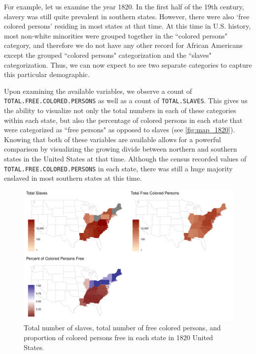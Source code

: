 \documentclass[DIV=calc, paper=a4, fontsize=10pt, twocolumn]{scrartcl}\usepackage[]{graphicx}\usepackage[]{color}
\newenvironment{knitrout}{}{} %
\begin{document}
\par For example, let us examine the year 1820. In the first half of the 19th century, slavery was still quite prevalent in southern states. However, there were also `free colored persons' residing in most states at that time. At this time in U.S. history, most non-white minorities were grouped together in the ``colored persons" category, and therefore we do not have any other record for African Americans except the grouped ``colored persons" categorization and the ``slaves" categorization. Thus, we can now expect to see two separate categories to capture this particular demographic.  

\par Upon examining the available variables, we observe a count of \texttt{TOTAL.FREE.COLORED.PERSONS} as well as a count of \texttt{TOTAL.SLAVES}. This gives us the ability to visualize not only the total numbers in each of these categories within each state, but also the percentage of colored persons in each state that were categorized as ``free persons" as opposed to slaves (see \autoref{fig:map_1820}). Knowing that both of these variables are available allows for a powerful comparison by visualizing the growing divide between northern and southern states in the United States at that time. Although the census recorded values of \texttt{TOTAL.FREE.COLORED.PERSONS} in each state, there was still a huge majority enslaved in most southern states at this time.  


\begin{knitrout}
\color{fgcolor}\begin{figure}[h]
\includegraphics[width=.5\textwidth]{figure/map_1820-1} \caption[Total number of slaves, total number of free colored persons, and proportion of colored persons free in each state in 1820 United States]{Total number of slaves, total number of free colored persons, and proportion of colored persons free in each state in 1820 United States.}\label{fig:map_1820}
\end{figure}


\end{knitrout}
\end{document}
